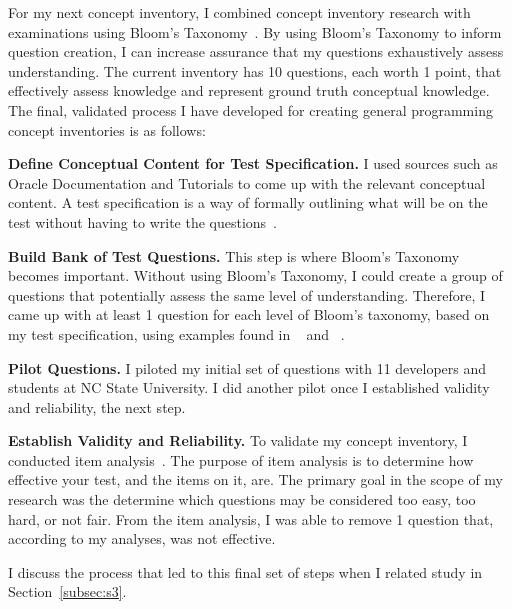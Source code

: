 \documentclass{llncs}
\begin{document}
For my next concept inventory, I combined concept inventory research with examinations using Bloom's Taxonomy~\cite{tew2010developing,nelson1967testing,scott2003bloom}. By using Bloom's Taxonomy to inform question creation, I can increase assurance that my questions exhaustively assess understanding. The current inventory has 10 questions, each worth 1 point, that effectively assess knowledge and represent ground truth conceptual knowledge. The final, validated process I have developed for creating general programming concept inventories is as follows:

\vspace{0.5em}
\noindent\textbf{Define Conceptual Content for Test Specification.} I used sources such as Oracle Documentation and Tutorials to come up with the relevant conceptual content. A test specification is a way of formally outlining what will be on the test without having to write the questions~\cite{tew2010developing}. 

\vspace{0.5em}

\noindent\textbf{Build Bank of Test Questions.} This step is where Bloom's Taxonomy becomes important. Without using Bloom's Taxonomy, I could create a group of questions that potentially assess the same level of understanding. Therefore, I came up with at least 1 question for each level of Bloom's taxonomy, based on my test specification, using examples found in ~\cite{nelson1967testing} and ~\cite{thompson2008bloom}.  

\vspace*{0.5em}

\noindent\textbf{Pilot Questions.} I piloted my initial set of questions with 11 developers and students at NC State University. I did another pilot once I established validity and reliability, the next step.

\vspace*{0.5em}

\noindent \textbf{Establish Validity and Reliability.} To validate my concept inventory, I conducted item analysis~\cite{gorsuch1997exploratory}. The purpose of item analysis is to determine how effective your test, and the items on it, are. The primary goal in the scope of my research was the determine which questions may be considered too easy, too hard, or not fair. From the item analysis, I was able to remove 1 question that, according to my analyses, was not effective.


I discuss the process that led to this final set of steps when I related study in Section~\ref{subsec:s3}.
\end{document}
